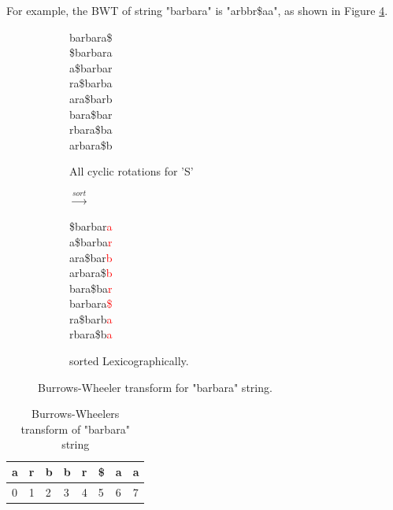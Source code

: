 \documentclass[11pt,a4paper]{report}
\begin{document}
For example, the BWT of string "barbara" is "arbbr\$aa", as shown in Figure 
\ref{barbaraBWT}.\\



\begin{figure}[H]
\centering
\begin{subfigure}{.5\textwidth}
  \centering
barbara\$\\
\$barbara\\
a\$barbar\\
ra\$barba\\
ara\$barb\\
bara\$bar\\
rbara\$ba\\
arbara\$b
  \caption{All cyclic rotations for 'S'}
  \label{fig:barbaraBWT1}
\end{subfigure}%
\begin{subfigure}{.1\textwidth}
  \centering
$\xrightarrow{sort}$
\label{fig:sub1}
\end{subfigure}%
\begin{subfigure}{.5\textwidth}
  \centering
\$barbar\textcolor{red}{a}\\
a\$barba\textcolor{red}{r}\\
ara\$bar\textcolor{red}{b}\\
arbara\$\textcolor{red}{b}\\
bara\$ba\textcolor{red}{r}\\
barbara\textcolor{red}{\$}\\
ra\$barb\textcolor{red}{a}\\
rbara\$b\textcolor{red}{a}
 \caption{sorted  Lexicographically.}
  \label{fig:Burrows-Wheeler transform}
\end{subfigure}
\caption{Burrows-Wheeler transform for "barbara" string.}
\label{barbaraBWT}
\end{figure}




\begin{table}[h]
 \centering
  \begin{tabular}{ | p{0.5cm} | p{0.5cm} | p{0.5cm} |p{0.5cm} 
  |p{0.5cm} |p{0.5cm} |p{0.5cm} |p{0.5cm} |}
    \hline
  \textbf{a} & \textbf{r} &\textbf{b}  &\textbf{b} &\textbf{r} 
  &\textbf{\$} &\textbf{a} &\textbf{a}\\ \hline
       0 & 1 &2&3&4&5&6&7 \\ \hline
      
   \end{tabular}
\caption{Burrows-Wheelers transform of "barbara" string}
\label{BWT-barbara}
\end{table}
\end{document}

